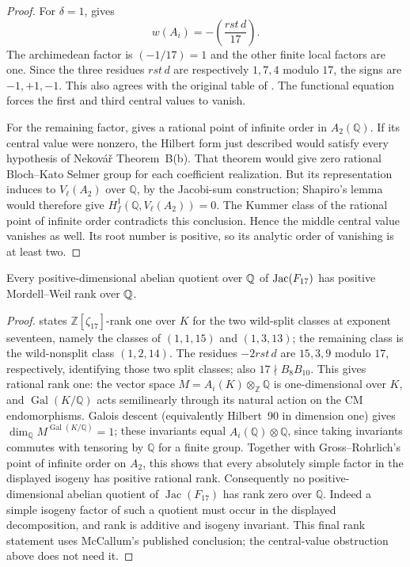 \begin{proof}
For $\delta=1$, \citet[Theorem~3.13, author pp.~17--18]{ShuExpanded2021} gives
\[
 w(A_i)=-\left(\frac{rst\,d}{17}\right).
\]
The archimedean factor is $(-1/17)=1$ and the other finite local
factors are one.  Since the three residues $rst\,d$ are respectively
$1,7,4$ modulo $17$, the signs are $-1,+1,-1$.  This also agrees
with the original table of \citet[p.~219]{GrossRohrlich1978}.  The functional
equation forces the first and third central values to vanish.

For the remaining factor, \citet[Theorem~2.1, p.~208]{GrossRohrlich1978}
gives a rational point of infinite order in $A_2(\mathbb Q)$.
If its central value were nonzero, the Hilbert form just described
would satisfy every hypothesis of Nekov\'a\v r Theorem~B(b).
That theorem would give zero rational Bloch--Kato Selmer group
for each coefficient realization.  But its representation induces
to $V_\ell(A_2)$ over $\mathbb Q$, by the Jacobi-sum construction;
Shapiro's lemma would therefore give
$H^1_f(\mathbb Q,V_\ell(A_2))=0$.
The Kummer class of the rational point of infinite order contradicts
this conclusion.  Hence the middle central value vanishes as well.
Its root number is positive, so its analytic order of vanishing is
at least two.
\end{proof}

\begin{corollary}
\label{cor:seventeen-no-rankzero-quotient}
Every positive-dimensional abelian quotient over $\mathbb Q$ of
$\operatorname{Jac}(F_{17})$ has positive Mordell--Weil rank over $\mathbb Q$.
\end{corollary}
\begin{proof}
\citet[Concluding remark~2, p.~665]{McCallum1988} states
$\mathbb Z[\zeta_{17}]$-rank one over $K$ for the two wild-split
classes at exponent seventeen, namely the
classes of $(1,1,15)$ and $(1,3,13)$; the remaining class is the
wild-nonsplit class $(1,2,14)$. The residues $-2rst\,d$ are
$15,3,9$ modulo $17$, respectively, identifying those two split classes;
also $17\nmid B_8B_{10}$. This gives rational rank one:
the vector space $M=A_i(K)\otimes_{\mathbb Z}\mathbb Q$ is
one-dimensional over $K$, and $\operatorname{Gal}(K/\mathbb Q)$
acts semilinearly through its natural action on the CM
endomorphisms.  Galois descent (equivalently Hilbert~90 in dimension
one) gives $\dim_{\mathbb Q}M^{\operatorname{Gal}(K/\mathbb Q)}=1$;
these invariants equal $A_i(\mathbb Q)\otimes\mathbb Q$, since
taking invariants commutes with tensoring by $\mathbb Q$ for a
finite group.  Together with Gross--Rohrlich's
point of infinite order on $A_2$, this shows that every absolutely
simple factor in the displayed isogeny has positive rational rank.
Consequently no positive-dimensional abelian quotient of
$\operatorname{Jac}(F_{17})$ has rank zero over $\mathbb Q$.
Indeed a simple isogeny factor of such a quotient must occur in
the displayed decomposition, and rank is additive and isogeny
invariant.  This final rank statement uses McCallum's published
conclusion; the central-value obstruction above does not need it.
\end{proof}


